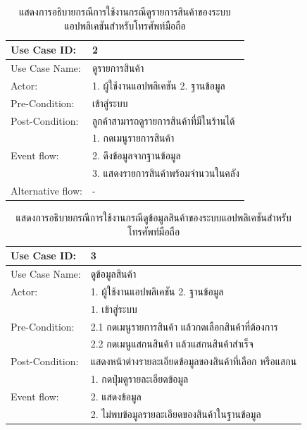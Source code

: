\begin{table}[htbp]
  \centering
  \caption{แสดงการอธิบายกรณีการใช้งานกรณีดูรายการสินค้าของระบบแอปพลิเคชันสำหรับโทรศัพท์มือถือ}
  \label{tab:example}
  \begin{tabularx}{\textwidth}{|p{3cm}|X|}
    \hline
    \multirow{1}{3cm}{Use Case ID:}      & 2                              \\
    \hline
    \multirow{1}{3cm}{Use Case Name:}    & ดูรายการสินค้า                    \\
    \hline
    \multirow{1}{3cm}{Actor:}            & 1. ผู้ใช้งานแอปพลิเคชัน 2. ฐานข้อมูล  \\
    \hline
    \multirow{1}{3cm}{Pre-Condition:}    & เข้าสู่ระบบ                       \\
    \hline
    \multirow{1}{3cm}{Post-Condition:}   & ลูกค้าสามารถดูรายการสินค้าที่มีในร้านได้ \\
    \hline
    \multirow{3}{3cm}{Event flow:}       & 1. กดเมนูรายการสินค้า             \\
                                         & 2. ดึงข้อมูลจากฐานข้อมูล            \\ & 3. แสดงรายการสินค้าพร้อมจำนวนในคลัง \\
    \hline
    \multirow{1}{3cm}{Alternative flow:} & -                              \\
    \hline
  \end{tabularx}
\end{table}

\begin{table}[htbp]
  \centering
  \caption{แสดงการอธิบายกรณีการใช้งานกรณีดูข้อมูลสินค้าของระบบแอปพลิเคชันสำหรับโทรศัพท์มือถือ}
  \label{tab:example}
  \begin{tabularx}{\textwidth}{|p{3cm}|X|}
    \hline
    \multirow{1}{3cm}{Use Case ID:}      & 3                                           \\
    \hline
    \multirow{1}{3cm}{Use Case Name:}    & ดูข้อมูลสินค้า                                   \\
    \hline
    \multirow{1}{3cm}{Actor:}            & 1. ผู้ใช้งานแอปพลิเคชัน 2. ฐานข้อมูล               \\
    \hline
    \multirow{3}{3cm}{Pre-Condition:}    & 1. เข้าสู่ระบบ                                 \\ & 2.1 กดเมนูรายการสินค้า แล้วกดเลือกสินค้าที่ต้องการ \\
                                         & 2.2 กดเมนูแสกนสินค้า แล้วแสกนสินค้าสำเร็จ           \\
    \hline
    \multirow{1}{3cm}{Post-Condition:}   & แสดงหน้าต่างรายละเอียดข้อมูลของสินค้าที่เลือก หรือแสกน \\
    \hline
    \multirow{3}{3cm}{Event flow:}       & 1. กดปุ่มดูรายละเอียดข้อมูล                       \\
                                         & 2. แสดงข้อมูล                                 \\
    \hline
    \multirow{1}{3cm}{Alternative flow:} & 2. ไม่พบข้อมูลรายละเอียดของสินค้าในฐานข้อมูล        \\
    \hline
  \end{tabularx}
\end{table}

